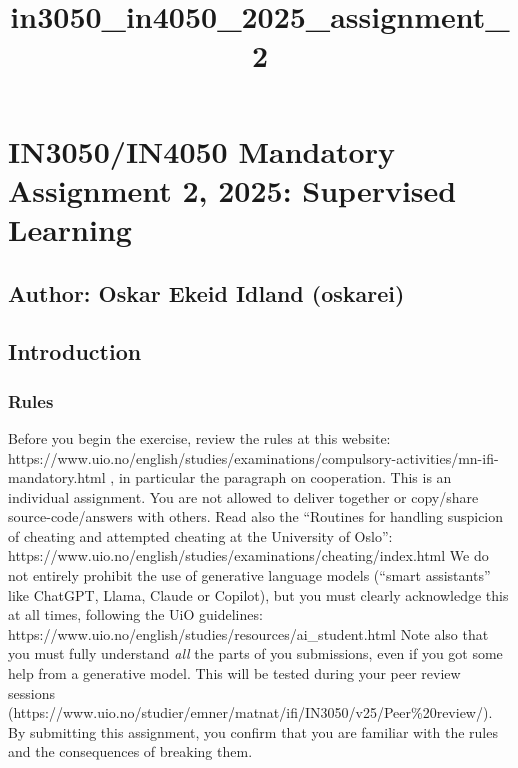 \documentclass[a4paper,landscape]{article}
\title{in3050\_in4050\_2025\_assignment\_2}
\begin{document}
    
    \maketitle
    
    

    
    \section{IN3050/IN4050 Mandatory Assignment 2, 2025: Supervised
Learning}\label{in3050in4050-mandatory-assignment-2-2025-supervised-learning}

\subsection{Author: Oskar Ekeid Idland
(oskarei)}\label{author-oskar-ekeid-idland-oskarei}

    \subsection{Introduction}\label{introduction}

    \subsubsection{Rules}\label{rules}

Before you begin the exercise, review the rules at this website:
https://www.uio.no/english/studies/examinations/compulsory-activities/mn-ifi-mandatory.html
, in particular the paragraph on cooperation. This is an individual
assignment. You are not allowed to deliver together or copy/share
source-code/answers with others. Read also the ``Routines for handling
suspicion of cheating and attempted cheating at the University of
Oslo'':
https://www.uio.no/english/studies/examinations/cheating/index.html We
do not entirely prohibit the use of generative language models (``smart
assistants'' like ChatGPT, Llama, Claude or Copilot), but you must
clearly acknowledge this at all times, following the UiO guidelines:
https://www.uio.no/english/studies/resources/ai\_student.html Note also
that you must fully understand \emph{all} the parts of you submissions,
even if you got some help from a generative model. This will be tested
during your peer review sessions
(https://www.uio.no/studier/emner/matnat/ifi/IN3050/v25/Peer\%20review/).
By submitting this assignment, you confirm that you are familiar with
the rules and the consequences of breaking them.
\end{document}
